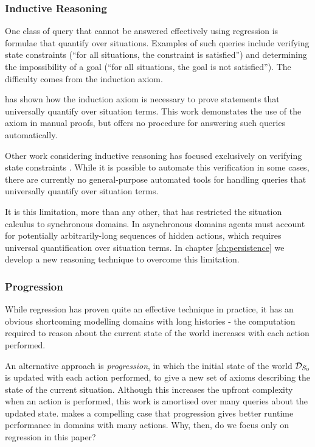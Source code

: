 \subsubsection{Inductive Reasoning}

One class of query that cannot be answered effectively using regression
is formulae that quantify over situations. Examples of such queries
include verifying state constraints ({}``for all situations, the
constraint is satisfied'') and determining the impossibility of a
goal ({}``for all situations, the goal is not satisfied''). The
difficulty comes from the induction axiom.

\citet{Reiter93proving} has shown how the induction axiom is necessary
to prove statements that universally quantify over situation terms.
This work demonstates the use of the axiom in manual proofs, but offers
no procedure for answering such queries automatically.

Other work considering inductive reasoning has focused exclusively
on verifying state constraints \citep{Lin94-StateConstraints,bertossi96automating}.
While it is possible to automate this verification in some cases,
there are currently no general-purpose automated tools for handling
queries that universally quantify over situation terms.

It is this limitation, more than any other, that has restricted the
situation calculus to synchronous domains. In asynchronous domains
agents must account for potentially arbitrarily-long sequences of
hidden actions, which requires universal quantification over situation
terms. In chapter \ref{ch:persistence} we develop a new reasoning
technique to overcome this limitation.


\subsubsection{Progression}

While regression has proven quite an effective technique in practice,
it has an obvious shortcoming modelling domains with long histories
- the computation required to reason about the current state of the
world increases with each action performed.

An alternative approach is \emph{progression}, in which the initial
state of the world $\mathcal{D}_{S_{0}}$ is updated with each action performed,
to give a new set of axioms describing the state of the current situation.
Although this increases the upfront complexity when an action is performed,
this work is amortised over many queries about the updated state.
\citet{thielscher04case_for_progression} makes a compelling case
that progression gives better runtime performance in domains with
many actions. Why, then, do we focus only on regression in this paper?

